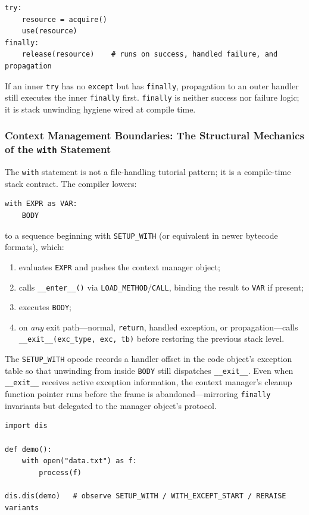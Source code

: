 \begin{verbatim}
try:
    resource = acquire()
    use(resource)
finally:
    release(resource)    # runs on success, handled failure, and propagation
\end{verbatim}

If an inner \texttt{try} has no \texttt{except} but has \texttt{finally}, propagation to an outer handler still executes the inner \texttt{finally} first. \texttt{finally} is neither success nor failure logic; it is stack unwinding hygiene wired at compile time.

\subsubsection{Context Management Boundaries: The Structural Mechanics of the \texttt{with} Statement}

The \texttt{with} statement is not a file-handling tutorial pattern; it is a compile-time stack contract. The compiler lowers:

\begin{verbatim}
with EXPR as VAR:
    BODY
\end{verbatim}

to a sequence beginning with \texttt{SETUP\_WITH} (or equivalent in newer bytecode formats), which:

\begin{enumerate}
    \item evaluates \texttt{EXPR} and pushes the context manager object;
    \item calls \texttt{\_\_enter\_\_()} via \texttt{LOAD\_METHOD}/\texttt{CALL}, binding the result to \texttt{VAR} if present;
    \item executes \texttt{BODY};
    \item on \emph{any} exit path---normal, \texttt{return}, handled exception, or propagation---calls \texttt{\_\_exit\_\_(exc\_type, exc, tb)} before restoring the previous stack level.
\end{enumerate}

The \texttt{SETUP\_WITH} opcode records a handler offset in the code object's exception table so that unwinding from inside \texttt{BODY} still dispatches \texttt{\_\_exit\_\_}. Even when \texttt{\_\_exit\_\_} receives active exception information, the context manager's cleanup function pointer runs before the frame is abandoned---mirroring \texttt{finally} invariants but delegated to the manager object's protocol.

\begin{verbatim}
import dis

def demo():
    with open("data.txt") as f:
        process(f)

dis.dis(demo)   # observe SETUP_WITH / WITH_EXCEPT_START / RERAISE variants
\end{verbatim}

